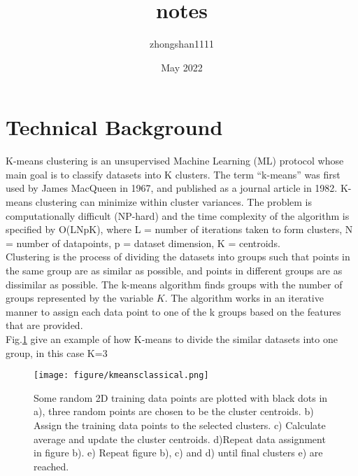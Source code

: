 \documentclass{article}
\title{notes}
\author{zhongshan1111 }
\date{May 2022}
\begin{document}
\section{Technical Background}
K-means clustering is an unsupervised Machine Learning (ML) protocol whose main goal is to classify datasets into K clusters. The term “k-means” was first used by James MacQueen in 1967, and published as a journal article in 1982. K-means clustering can minimize within cluster variances. The problem is computationally difficult (NP-hard) and the time complexity of the algorithm is specified by O(LNpK), where L = number of iterations taken to form clusters, N = number of datapoints, p = dataset dimension, K = centroids.\\

Clustering is the process of dividing the datasets into groups such that points in the same group are as similar as possible, and points in different groups are as dissimilar as possible. The k-means algorithm finds groups with the number of groups represented by the variable $K$. The algorithm works in an iterative manner to assign each data point to one of the k groups based on the features that are provided. \\

Fig.\ref{fig:kmeansclassica} give an example of how K-means to divide the similar datasets into one group, in this case K=3
\begin{figure}[h]
    \centering
    \texttt{[image: figure/kmeansclassical.png]}
    \caption{Some random 2D training data points are plotted with black dots in a), three random points are chosen to be the cluster centroids. b) Assign the training data points to the selected clusters. c) Calculate average and update the cluster centroids. d)Repeat data assignment in figure b). e) Repeat figure b), c) and d) until final clusters e) are reached.}
    \label{fig:kmeansclassica}
\end{figure}
\end{document}
